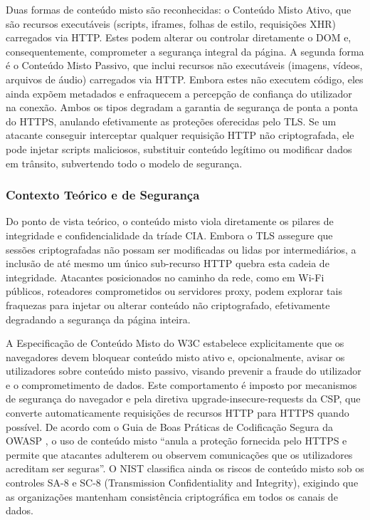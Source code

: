Duas formas de conteúdo misto são reconhecidas: o Conteúdo Misto Ativo, que são recursos executáveis (scripts, iframes, folhas de estilo, requisições XHR) carregados via HTTP. Estes podem alterar ou controlar diretamente o DOM e, consequentemente, comprometer a segurança integral da página. A segunda forma é o Conteúdo Misto Passivo, que inclui recursos não executáveis (imagens, vídeos, arquivos de áudio) carregados via HTTP. Embora estes não executem código, eles ainda expõem metadados e enfraquecem a percepção de confiança do utilizador na conexão. Ambos os tipos degradam a garantia de segurança de ponta a ponta do HTTPS, anulando efetivamente as proteções oferecidas pelo TLS. Se um atacante conseguir interceptar qualquer requisição HTTP não criptografada, ele pode injetar scripts maliciosos, substituir conteúdo legítimo ou modificar dados em trânsito, subvertendo todo o modelo de segurança. \cite{ref49}

\subsubsection{Contexto Teórico e de Segurança}

Do ponto de vista teórico, o conteúdo misto viola diretamente os pilares de integridade e confidencialidade da tríade CIA. Embora o TLS assegure que sessões criptografadas não possam ser modificadas ou lidas por intermediários, a inclusão de até mesmo um único sub-recurso HTTP quebra esta cadeia de integridade. Atacantes posicionados no caminho da rede, como em Wi-Fi públicos, roteadores comprometidos ou servidores proxy, podem explorar tais fraquezas para injetar ou alterar conteúdo não criptografado, efetivamente degradando a segurança da página inteira. 

A Especificação de Conteúdo Misto do W3C \cite{ref50} estabelece explicitamente que os navegadores devem bloquear conteúdo misto ativo e, opcionalmente, avisar os utilizadores sobre conteúdo misto passivo, visando prevenir a fraude do utilizador e o comprometimento de dados. Este comportamento é imposto por mecanismos de segurança do navegador e pela diretiva upgrade-insecure-requests da CSP, que converte automaticamente requisições de recursos HTTP para HTTPS quando possível. De acordo com o Guia de Boas Práticas de Codificação Segura da OWASP \cite{ref51}, o uso de conteúdo misto “anula a proteção fornecida pelo HTTPS e permite que atacantes adulterem ou observem comunicações que os utilizadores acreditam ser seguras”. O NIST \cite{ref8} classifica ainda os riscos de conteúdo misto sob os controles SA-8 e SC-8 (Transmission Confidentiality and Integrity), exigindo que as organizações mantenham consistência criptográfica em todos os canais de dados. 

